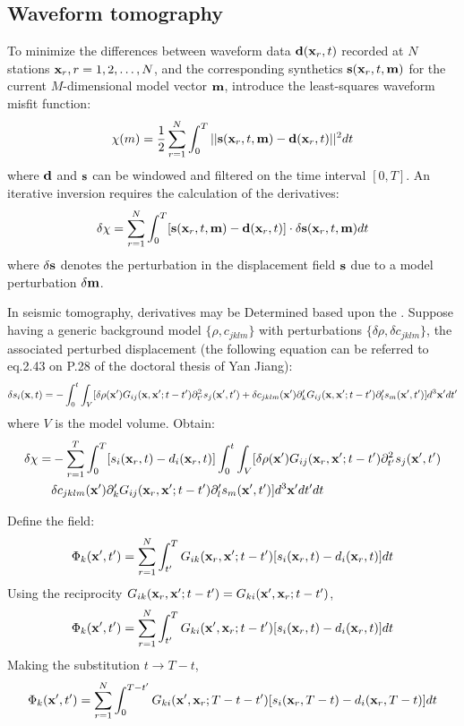 \subsection{Waveform tomography}
To minimize the differences between waveform data $\mathbf{d}(\mathbf{x}_r,t)$ recorded at $N$ stations $\mathbf{x}_r,r=1,2,\ldots,N$, and the corresponding synthetics $\mathbf{s}(\mathbf{x}_r,t,\mathbf{m})$ for the current $M$-dimensional model vector $\mathbf{m}$, introduce the least-squares waveform misfit function:
\[ \chi(m)=\frac{1}{2}\sum_{r=1}^N\int_0^T||\mathbf{s}(\mathbf{x}_r,t,\mathbf{m})-\mathbf{d}(\mathbf{x}_r,t)||^2dt \]
where $\mathbf{d}$ and $\mathbf{s}$ can be windowed and filtered on the time interval $[0,T]$. An iterative inversion requires the calculation of the \Frechet derivatives:
\[ \delta\chi=\sum_{r=1}^N\int_0^T[\mathbf{s}(\mathbf{x}_r,t,\mathbf{m})-\mathbf{d}(\mathbf{x}_r,t)]\cdot\delta\mathbf{s}(\mathbf{x}_r,t,\mathbf{m})dt \]
where $\delta\mathbf{s}$ denotes the perturbation in the displacement field $\mathbf{s}$ due to a model perturbation $\delta\mathbf{m}$.\par
In seismic tomography, \Frechet derivatives may be Determined based upon the . Suppose having a generic background model $\{\rho,c_{jklm}\}$ with perturbations $\{\delta\rho,\delta c_{jklm}\}$, the associated perturbed displacement (the following equation can be referred to eq.2.43 on P.28 of the doctoral thesis of Yan Jiang):
\[ \delta s_i(\mathbf{x},t)=-\int_0^t\int_V[\delta\rho(\mathbf{x}')G_{ij}(\mathbf{x},\mathbf{x}';t-t')\partial_{t'}^2s_j(\mathbf{x}',t')+\delta c_{jklm}(\mathbf{x}')\partial_k^\prime G_{ij}(\mathbf{x},\mathbf{x}';t-t')\partial_l^\prime s_m(\mathbf{x}',t')]d^3\mathbf{x}'dt' \]
where $V$ is the model volume. Obtain:
\begin{align*}
  \delta\chi= & -\sum_{r=1}^T\int_0^T[s_i(\mathbf{x}_r,t)-d_i(\mathbf{x}_r,t)]\int_0^t\int_V[\delta\rho(\mathbf{x}')G_{ij}(\mathbf{x}_r,\mathbf{x}';t-t')\partial_{t'}^2s_j(\mathbf{x}',t') \\
    & \delta c_{jklm}(\mathbf{x}')\partial_k^\prime G_{ij}(\mathbf{x}_r,\mathbf{x}';t-t')\partial_l^\prime s_m(\mathbf{x}',t')]d^3\mathbf{x}'dt'dt
\end{align*}\par
Define the field:
\[ \Phi_k(\mathbf{x}',t')=\sum_{r=1}^N\int_{t'}^TG_{ik}(\mathbf{x}_r,\mathbf{x}';t-t')[s_i(\mathbf{x}_r,t)-d_i(\mathbf{x}_r,t)]dt \]
Using the reciprocity $G_{ik}(\mathbf{x}_r,\mathbf{x}';t-t')=G_{ki}(\mathbf{x}',\mathbf{x}_r;t-t')$,
\[ \Phi_k(\mathbf{x}',t')=\sum_{r=1}^N\int_{t'}^TG_{ki}(\mathbf{x}',\mathbf{x}_r;t-t')[s_i(\mathbf{x}_r,t)-d_i(\mathbf{x}_r,t)]dt \]
Making the substitution $t\rightarrow T-t$,
\[ \Phi_k(\mathbf{x}',t')=\sum_{r=1}^N\int_0^{T-t'}G_{ki}(\mathbf{x}',\mathbf{x}_r;T-t-t')[s_i(\mathbf{x}_r,T-t)-d_i(\mathbf{x}_r,T-t)]dt \]
